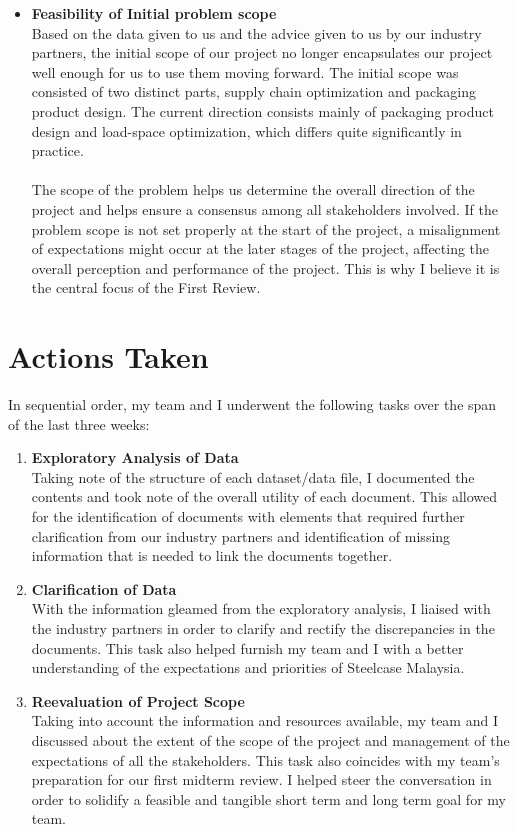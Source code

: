 \documentclass[a4paper, fleqn]{article}
\begin{document}
\begin{itemize}
\item \textbf{Feasibility of Initial problem scope}\\
Based on the data given to us and the advice given to us by our industry partners, the initial scope of our project no longer encapsulates our project well enough for us to use them moving forward. The initial scope was consisted of two distinct parts, supply chain optimization and packaging product design. The current direction consists mainly of packaging product design and load-space optimization, which differs quite significantly in practice.\\
\vspace{1pt}\\
The scope of the problem helps us determine the overall direction of the project and helps ensure a consensus among all stakeholders involved. If the problem scope is not set properly at the start of the project, a misalignment of expectations might occur at the later stages of the project, affecting the overall perception and performance of the project. This is why I believe it is the central focus of the First Review.  
\end{itemize}

\section{Actions Taken}

In sequential order, my team and I underwent the following tasks over the span of the last three weeks:\begin{enumerate}
\item \textbf{Exploratory Analysis of Data}\\
Taking note of the structure of each dataset/data file, I documented the contents and took note of the overall utility of each document. This allowed for the identification of documents with elements that required further clarification from our industry partners and identification of missing information that is needed to link the documents together.
\item \textbf{Clarification of Data}\\
With the information gleamed from the exploratory analysis, I liaised with the industry partners in order to clarify and rectify the discrepancies in the documents. This task also helped furnish my team and I with a better understanding of the expectations and priorities of Steelcase Malaysia.
\item \textbf{Reevaluation of Project Scope}\\
Taking into account the information and resources available, my team and I discussed about the extent of the scope of the project and management of the expectations of all the stakeholders. This task also coincides with my team's preparation for our first midterm review. I helped steer the conversation in order to solidify a feasible and tangible short term and long term goal for my team.
\end{enumerate}
\end{document}
